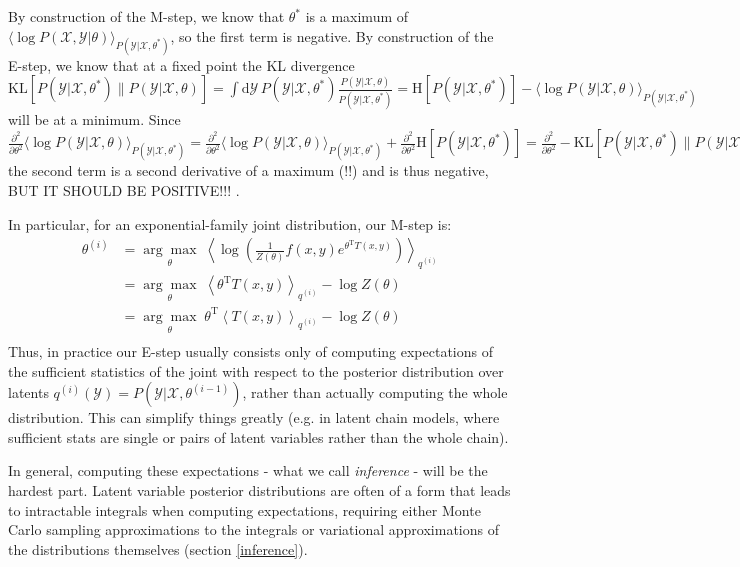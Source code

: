 \documentclass[a4paper]{article}
\begin{document}
By construction of the M-step, we know that $\theta^*$ is a maximum of $\langle\log P(\mathcal{X,Y}|\theta)\rangle_{P(\mathcal{Y}|\mathcal{X},\theta^*)}$, so the first term is negative. By construction of the E-step, we know that at a fixed point the KL divergence $\textrm{KL}\left[P(\mathcal{Y}|\mathcal{X},\theta^*) \| P(\mathcal{Y}|\mathcal{X},\theta)\right] = \int \textrm{d}\mathcal{Y}\, P(\mathcal{Y}|\mathcal{X},\theta^*)\frac{P(\mathcal{Y}|\mathcal{X},\theta)}{P(\mathcal{Y}|\mathcal{X},\theta^*)} = \textrm{H}[P(\mathcal{Y}|\mathcal{X},\theta^*)] - \langle\log P(\mathcal{Y}|\mathcal{X},\theta)\rangle_{P(\mathcal{Y}|\mathcal{X},\theta^*)}$ will be at a minimum. Since $\frac{\partial^2}{\partial \theta^2} \langle\log P(\mathcal{Y}|\mathcal{X},\theta)\rangle_{P(\mathcal{Y}|\mathcal{X},\theta^*)} = \frac{\partial^2}{\partial \theta^2} \langle\log P(\mathcal{Y}|\mathcal{X},\theta)\rangle_{P(\mathcal{Y}|\mathcal{X},\theta^*)} + \frac{\partial^2}{\partial \theta^2} \textrm{H}[P(\mathcal{Y}|\mathcal{X},\theta^*)] = \frac{\partial^2}{\partial \theta^2}-\textrm{KL}\left[P(\mathcal{Y}|\mathcal{X},\theta^*) \| P(\mathcal{Y}|\mathcal{X},\theta)\right]$ the second term is a second derivative of a maximum (!!) and is thus negative, BUT IT SHOULD BE POSITIVE!!! .

In particular, for an exponential-family joint distribution, our M-step is:
\begin{align*}
\theta^{(i)} &= \underset{\theta}{\arg\max} \; \left\langle\log \left(\frac{1}{Z(\theta)}f(x,y)e^{\theta^\textrm{T}T(x,y)}\right)\right\rangle_{q^{(i)}} \\
&= \underset{\theta}{\arg\max} \; \left\langle\theta^\textrm{T}T(x,y)\right\rangle_{q^{(i)}} - \log Z(\theta) \\
&= \underset{\theta}{\arg\max} \; \theta^\textrm{T}\left\langle T(x,y)\right\rangle_{q^{(i)}} - \log Z(\theta) \\
\end{align*}
Thus, in practice our E-step usually consists only of computing expectations of the sufficient statistics of the joint with respect to the posterior distribution over latents $q^{(i)}(\mathcal{Y}) = P(\mathcal{Y}|\mathcal{X},\theta^{(i-1)})$, rather than actually computing the whole distribution. This can simplify things greatly (e.g. in latent chain models, where sufficient stats are single or pairs of latent variables rather than the whole chain).

In general, computing these expectations - what we call \emph{inference} - will be the hardest part. Latent variable posterior distributions are often of a form that leads to intractable integrals when computing expectations, requiring either Monte Carlo sampling approximations to the integrals or variational approximations of the distributions themselves (section \ref{inference}).
\end{document}
